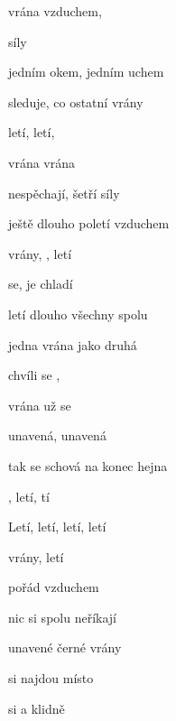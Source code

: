

\zs
{} vrána  vzduchem,

  síly

{jedním} okem, {jedním} uchem

{sleduje}, co {ostatní} vrány
\ks

\zs
{} letí,  letí,

 vrána  vrána

nespěchají, šetří síly

ještě dlouho poletí vzduchem
\ks

\zs
{} vrány, , letí

 se,  je chladí

letí dlouho všechny spolu

jedna vrána jako druhá
\ks

\zs
{} chvíli se ,

 vrána už se 

unavená, unavená

tak se schová na konec hejna
\ks

\zr
{}, letí, tí  

Letí, letí, letí, letí
\kr

\zs
{} vrány,  letí

 pořád  vzduchem

nic si spolu neříkají

unavené černé vrány
\ks

\zr
{} si najdou  místo

 si a  klidně 
\kr

\kp






















